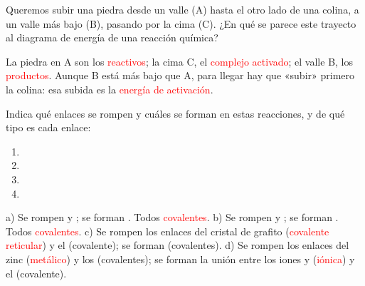 \begin{exercise}
    Queremos subir una piedra desde un valle (A) hasta el otro lado de una colina, a un valle más bajo (B), pasando por la cima (C). ¿En qué se parece este trayecto al diagrama de energía de una reacción química?
    \begin{solu}
        La piedra en A son los \textcolor{red}{reactivos}; la cima C, el \textcolor{red}{complejo activado}; el valle B, los \textcolor{red}{productos}. Aunque B está más bajo que A, para llegar hay que «subir» primero la colina: esa subida es la \textcolor{red}{energía de activación}.
    \end{solu}
\end{exercise}

\begin{exercise}
    Indica qué enlaces se rompen y cuáles se forman en estas reacciones, y de qué tipo es cada enlace:
    \begin{enumerate}[label=\alph*)]
        \item {}
        \item {}
        \item {}
        \item {}
    \end{enumerate}
    \begin{solu}
        a) Se rompen  y ; se forman . Todos \textcolor{red}{covalentes}.
        b) Se rompen  y ; se forman . Todos \textcolor{red}{covalentes}.
        c) Se rompen los enlaces  del cristal de grafito (\textcolor{red}{covalente reticular}) y el  (covalente); se forman  (covalentes).
        d) Se rompen los enlaces del zinc (\textcolor{red}{metálico}) y los  (covalentes); se forman la unión entre los iones  y  (\textcolor{red}{iónica}) y el  (covalente).
    \end{solu}
\end{exercise}

